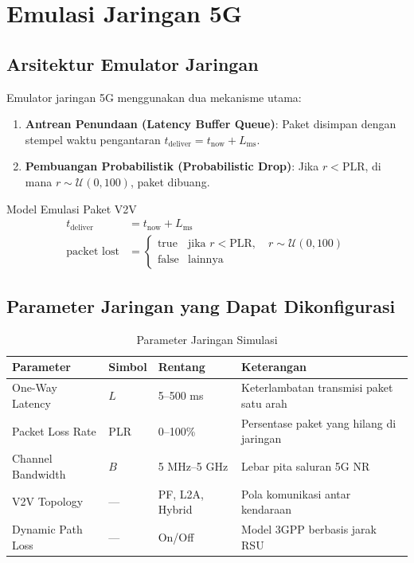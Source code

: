 \documentclass[12pt,a4paper]{article}
\begin{document}
\section{Emulasi Jaringan 5G}

\subsection{Arsitektur Emulator Jaringan}

Emulator jaringan 5G menggunakan dua mekanisme utama:
\begin{enumerate}
  \item \textbf{Antrean Penundaan (Latency Buffer Queue)}: Paket disimpan dengan stempel
        waktu pengantaran $t_{\text{deliver}} = t_{\text{now}} + L_{\text{ms}}$.
  \item \textbf{Pembuangan Probabilistik (Probabilistic Drop)}: Jika $r < \text{PLR}$,
        di mana $r \sim \mathcal{U}(0,100)$, paket dibuang.
\end{enumerate}

\begin{formulabox}{Model Emulasi Paket V2V}
\begin{align}
  t_{\text{deliver}} &= t_{\text{now}} + L_{\text{ms}} \label{eq:latency}\\[4pt]
  \text{packet lost} &= \begin{cases}
    \text{true}  & \text{jika } r < \text{PLR},\quad r \sim \mathcal{U}(0,100) \\
    \text{false} & \text{lainnya}
  \end{cases} \label{eq:plr}
\end{align}
\end{formulabox}

\subsection{Parameter Jaringan yang Dapat Dikonfigurasi}

\begin{table}[ht]
\centering
\caption{Parameter Jaringan Simulasi}
\begin{tabularx}{\linewidth}{lllX}
\toprule
\textbf{Parameter} & \textbf{Simbol} & \textbf{Rentang} & \textbf{Keterangan} \\
\midrule
One-Way Latency & $L$ & 5--500 ms & Keterlambatan transmisi paket satu arah \\
Packet Loss Rate & PLR & 0--100\% & Persentase paket yang hilang di jaringan \\
Channel Bandwidth & $B$ & 5 MHz--5 GHz & Lebar pita saluran 5G NR \\
V2V Topology & --- & PF, L2A, Hybrid & Pola komunikasi antar kendaraan \\
Dynamic Path Loss & --- & On/Off & Model 3GPP berbasis jarak RSU \\
\bottomrule
\end{tabularx}
\end{table}
\end{document}
